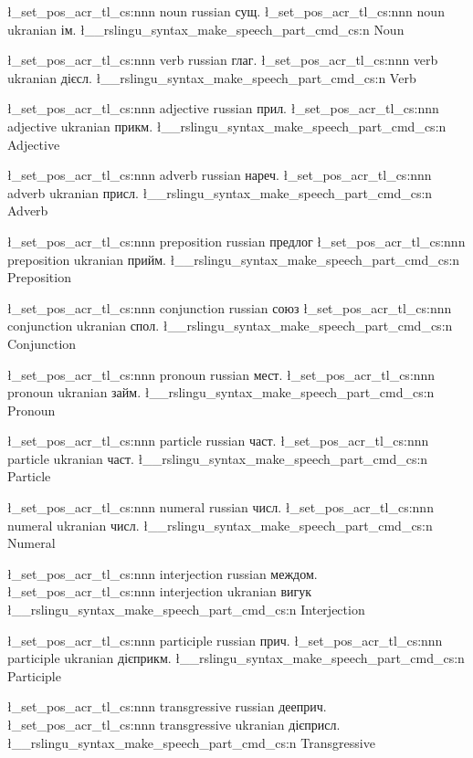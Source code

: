 

\l_set_pos_acr_tl_cs:nnn { noun } { russian } { сущ. } 
\l_set_pos_acr_tl_cs:nnn { noun } { ukranian } { ім. }
\l__rslingu_syntax_make_speech_part_cmd_cs:n { Noun }



\l_set_pos_acr_tl_cs:nnn { verb } { russian } { глаг. }
\l_set_pos_acr_tl_cs:nnn { verb } { ukranian } { дієсл. }
\l__rslingu_syntax_make_speech_part_cmd_cs:n { Verb }



\l_set_pos_acr_tl_cs:nnn { adjective } { russian } { прил. }
\l_set_pos_acr_tl_cs:nnn { adjective } { ukranian } { прикм. }
\l__rslingu_syntax_make_speech_part_cmd_cs:n { Adjective }



\l_set_pos_acr_tl_cs:nnn { adverb } { russian } { нареч. }
\l_set_pos_acr_tl_cs:nnn { adverb } { ukranian } { присл. }
\l__rslingu_syntax_make_speech_part_cmd_cs:n { Adverb }



\l_set_pos_acr_tl_cs:nnn { preposition } { russian } { предлог }
\l_set_pos_acr_tl_cs:nnn { preposition } { ukranian } { прийм. }
\l__rslingu_syntax_make_speech_part_cmd_cs:n { Preposition }



\l_set_pos_acr_tl_cs:nnn { conjunction } { russian } { союз }
\l_set_pos_acr_tl_cs:nnn { conjunction } { ukranian } { спол. }
\l__rslingu_syntax_make_speech_part_cmd_cs:n { Conjunction }



\l_set_pos_acr_tl_cs:nnn { pronoun } { russian } { мест. }
\l_set_pos_acr_tl_cs:nnn { pronoun } { ukranian } { займ. }
\l__rslingu_syntax_make_speech_part_cmd_cs:n { Pronoun }



\l_set_pos_acr_tl_cs:nnn { particle } { russian } { част. }
\l_set_pos_acr_tl_cs:nnn { particle } { ukranian } { част. }
\l__rslingu_syntax_make_speech_part_cmd_cs:n { Particle }



\l_set_pos_acr_tl_cs:nnn { numeral } { russian } { числ. }
\l_set_pos_acr_tl_cs:nnn { numeral } { ukranian } { числ. }
\l__rslingu_syntax_make_speech_part_cmd_cs:n { Numeral }



\l_set_pos_acr_tl_cs:nnn { interjection } { russian } { междом. }
\l_set_pos_acr_tl_cs:nnn { interjection } { ukranian } { вигук }
\l__rslingu_syntax_make_speech_part_cmd_cs:n { Interjection }



\l_set_pos_acr_tl_cs:nnn { participle } { russian } { прич. }
\l_set_pos_acr_tl_cs:nnn { participle } { ukranian } { дієприкм. }
\l__rslingu_syntax_make_speech_part_cmd_cs:n { Participle }



\l_set_pos_acr_tl_cs:nnn { transgressive } { russian } { дееприч. }
\l_set_pos_acr_tl_cs:nnn { transgressive } { ukranian } { дієприсл. }
\l__rslingu_syntax_make_speech_part_cmd_cs:n { Transgressive }


\ExplSyntaxOff
